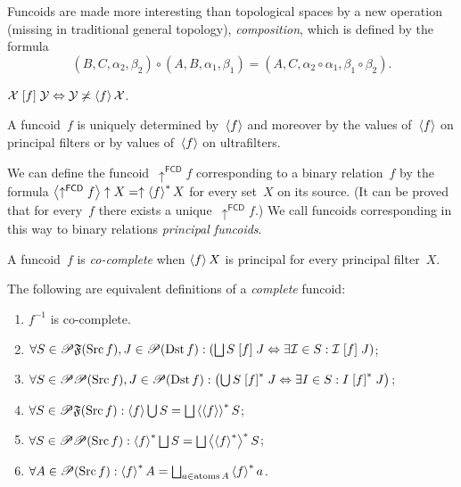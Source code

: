 \documentclass{amsart}
\begin{document}
Funcoids are made more interesting than topological spaces by a new operation (missing in traditional general topology),
\emph{composition}, which is defined by the formula
\[ (B,C,\alpha_2,\beta_2)\circ (A,B,\alpha_1,\beta_1) = (A,C,\alpha_2\circ\alpha_1,\beta_1\circ\beta_2). \]

\begin{defn}
$\mathcal{X}\mathrel{\left[f\right]}\mathcal{Y} \Leftrightarrow \mathcal{Y}\not\asymp\left\langle f\right\rangle\mathcal{X}$.
\end{defn}

A funcoid~$f$ is uniquely determined by~$\left\langle f\right\rangle$ and moreover by the values of~$\left\langle f\right\rangle$ on principal filters or by values of~$\left\langle f\right\rangle$ on ultrafilters.

We can define the funcoid~$\uparrow^{\mathsf{FCD}} f$ corresponding to a binary relation~$f$ by the formula $\left\langle \uparrow^{\mathsf{FCD}} f\right\rangle\uparrow X=\uparrow\left\langle f\right\rangle ^{\ast}X$ for every set~$X$ on its source. (It can be proved that for every~$f$ there exists a unique~$\uparrow^{\mathsf{FCD}} f$.) We call funcoids corresponding in this way to binary relations \emph{principal funcoids}.

\begin{defn}
A funcoid~$f$ is \emph{co-complete} when $\left\langle f\right\rangle X$ is principal for every principal filter~$X$.
\end{defn}

The following are equivalent definitions of a \emph{complete} funcoid:

\begin{enumerate}
\item $f^{-1}$ is co-complete.
\item \label{cfcd:r-filt}$\forall S\in\subsets\mathfrak{F}(\Src
f),J\in\subsets(\Dst f):\left(\bigsqcup S\suprel
fJ\Leftrightarrow\exists\mathcal{I}\in S:\mathcal{I}\suprel fJ\right)$;
\item \label{cfcd:r-set}$\forall S\in\mathscr{P}\mathscr{P}(\operatorname{Src} f),J\in\mathscr{P}(\operatorname{Dst}
f):\left(\bigcup S\mathrel{\left[f\right]^{\ast}}J\Leftrightarrow\exists I\in S:I\mathrel{\left[f\right]^{\ast}}J\right)$;
\item \label{cfcd:f-filt}$\forall S\in\subsets\mathfrak{F}(\Src f):\supfun
f\bigcup S=\bigsqcup\rsupfun{\supfun f}S$;
\item \label{cfcd:f-set}$\forall S\in\subsets\subsets(\Src f):\rsupfun
f\bigsqcup S=\bigsqcup\rsupfun{\rsupfun f}S$;
\item \label{cfcd:sing}$\forall A\in\subsets(\Src f):\rsupfun
fA=\bigsqcup_{a\in\atoms A}\rsupfun fa$.
\end{enumerate}
\end{document}
